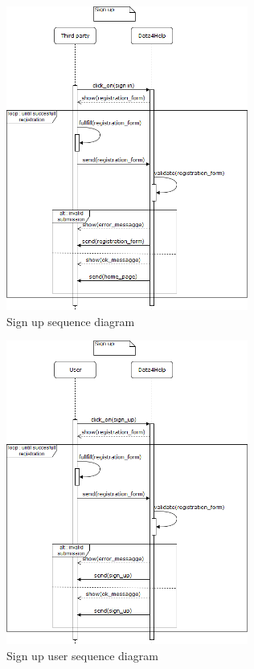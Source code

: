 \begin{figure}[H]
\includegraphics[width=\linewidth, height=10cm, keepaspectratio]{./Images/sequence_diag_sign_up.png}
\centering
\caption{Sign up sequence diagram}
\end{figure}

\begin{figure}[H]
\includegraphics[width=\linewidth, height=10cm, keepaspectratio]{./Images/sequence_diag_sign_up_user.png}
\centering
\caption{Sign up user sequence diagram}
\end{figure}


